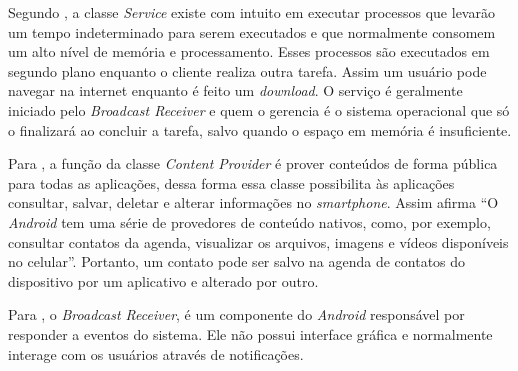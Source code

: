 	\par Segundo , a classe \textit{Service} existe
com intuito em executar processos que levarão um tempo indeterminado para serem
executados e que normalmente consomem um alto nível de memória e processamento.
Esses processos são executados em segundo plano enquanto o cliente realiza
outra tarefa. Assim um usuário pode navegar na internet enquanto é feito um
\textit{download}. O serviço é geralmente iniciado pelo \textit{Broadcast
Receiver} e quem o gerencia é o sistema operacional que só o finalizará ao
concluir a tarefa, salvo quando o espaço em memória é insuficiente.

	\par Para , a função da classe \textit{Content
Provider} é prover conteúdos de forma pública para todas as aplicações, dessa
forma essa classe possibilita às aplicações consultar, salvar,
deletar e alterar informações no \textit{smartphone}. Assim afirma
 “O \textit{Android} tem uma série de provedores
de conteúdo nativos, como, por exemplo, consultar contatos da agenda,
visualizar os arquivos, imagens e vídeos disponíveis no celular”. Portanto, um
contato pode ser salvo na agenda de contatos do dispositivo por um aplicativo e
alterado por outro.

	\par Para , o \textit{Broadcast Receiver},
é um componente do \textit{Android} responsável por responder a eventos do sistema.
Ele não possui interface gráfica e normalmente interage com os usuários através
de notificações.

